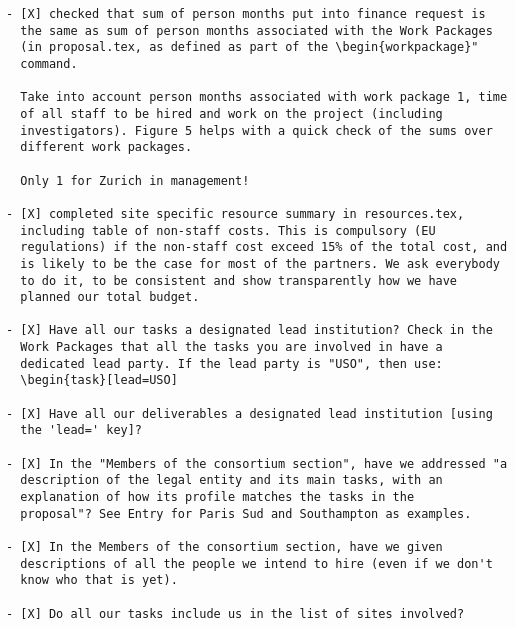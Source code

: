 \begin{draft}
\vspace{1cm}

\begin{verbatim}
- [X] checked that sum of person months put into finance request is
  the same as sum of person months associated with the Work Packages
  (in proposal.tex, as defined as part of the \begin{workpackage}"
  command.
  
  Take into account person months associated with work package 1, time
  of all staff to be hired and work on the project (including
  investigators). Figure 5 helps with a quick check of the sums over
  different work packages.
  
  Only 1 for Zurich in management!

- [X] completed site specific resource summary in resources.tex,
  including table of non-staff costs. This is compulsory (EU
  regulations) if the non-staff cost exceed 15% of the total cost, and
  is likely to be the case for most of the partners. We ask everybody
  to do it, to be consistent and show transparently how we have
  planned our total budget.

- [X] Have all our tasks a designated lead institution? Check in the
  Work Packages that all the tasks you are involved in have a
  dedicated lead party. If the lead party is "USO", then use:
  \begin{task}[lead=USO]

- [X] Have all our deliverables a designated lead institution [using
  the 'lead=' key]?

- [X] In the "Members of the consortium section", have we addressed "a
  description of the legal entity and its main tasks, with an
  explanation of how its profile matches the tasks in the
  proposal"? See Entry for Paris Sud and Southampton as examples.

- [X] In the Members of the consortium section, have we given
  descriptions of all the people we intend to hire (even if we don't
  know who that is yet). 
  
- [X] Do all our tasks include us in the list of sites involved?
\end{verbatim}
\end{draft}




